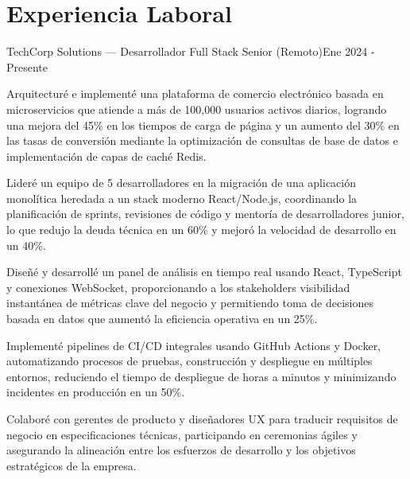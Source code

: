 
\section{Experiencia Laboral}

\begin{joblong}{TechCorp Solutions --- Desarrollador Full Stack Senior (Remoto)}{Ene 2024 - Presente}
\item Arquitecturé e implementé una plataforma de comercio electrónico basada en microservicios que atiende a más de 100,000 usuarios activos diarios, logrando una mejora del 45\% en los tiempos de carga de página y un aumento del 30\% en las tasas de conversión mediante la optimización de consultas de base de datos e implementación de capas de caché Redis.
\item Lideré un equipo de 5 desarrolladores en la migración de una aplicación monolítica heredada a un stack moderno React/Node.js, coordinando la planificación de sprints, revisiones de código y mentoría de desarrolladores junior, lo que redujo la deuda técnica en un 60\% y mejoró la velocidad de desarrollo en un 40\%.
\item Diseñé y desarrollé un panel de análisis en tiempo real usando React, TypeScript y conexiones WebSocket, proporcionando a los stakeholders visibilidad instantánea de métricas clave del negocio y permitiendo toma de decisiones basada en datos que aumentó la eficiencia operativa en un 25\%.
\item Implementé pipelines de CI/CD integrales usando GitHub Actions y Docker, automatizando procesos de pruebas, construcción y despliegue en múltiples entornos, reduciendo el tiempo de despliegue de horas a minutos y minimizando incidentes en producción en un 50\%.
\item Colaboré con gerentes de producto y diseñadores UX para traducir requisitos de negocio en especificaciones técnicas, participando en ceremonias ágiles y asegurando la alineación entre los esfuerzos de desarrollo y los objetivos estratégicos de la empresa.
\end{joblong}